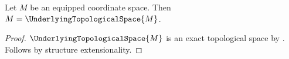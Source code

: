

\begin{proposition}\label{open_inheritance_is_not_an_exact_reduct}
    Let $M$ be an equipped coordinate space.
    Then $M=\UnderlyingTopologicalSpace{M}$.
\end{proposition}
\begin{proof}
    $\UnderlyingTopologicalSpace{M}$ is an exact topological space
        by .
    Follows by structure extensionality.
\end{proof}
